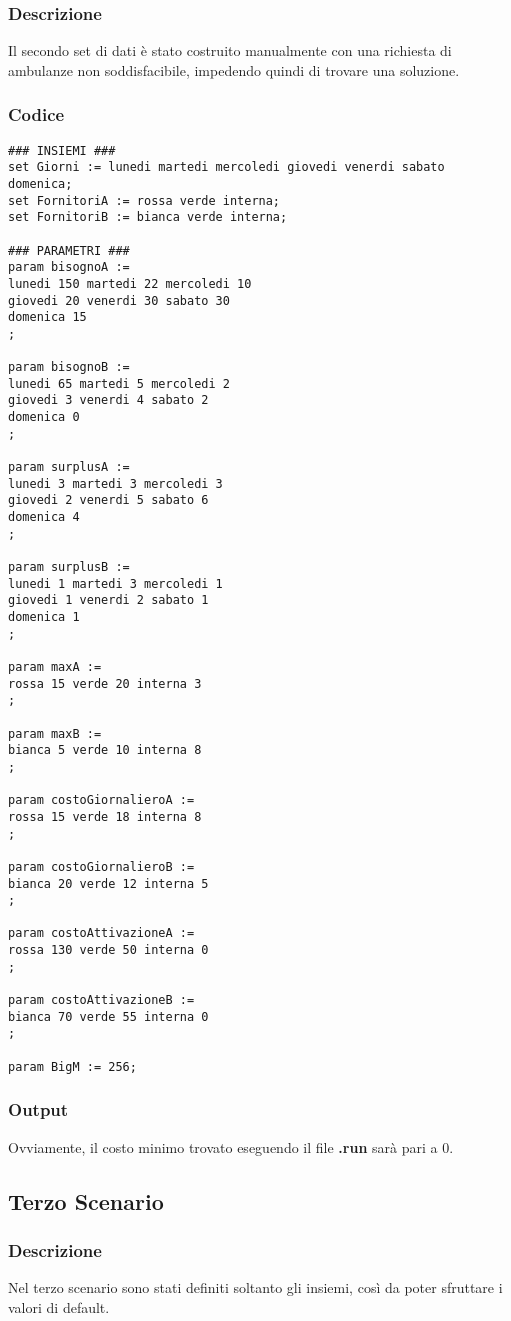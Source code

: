 \subsubsection{Descrizione}
Il secondo set di dati è stato costruito manualmente con una richiesta di ambulanze non soddisfacibile, impedendo quindi di trovare una soluzione.
\subsubsection{Codice}
\begin{lstlisting}
### INSIEMI ###
set Giorni := lunedi martedi mercoledi giovedi venerdi sabato domenica;
set FornitoriA := rossa verde interna;
set FornitoriB := bianca verde interna;

### PARAMETRI ###
param bisognoA := 
lunedi 150 martedi 22 mercoledi 10 
giovedi 20 venerdi 30 sabato 30
domenica 15
;

param bisognoB := 
lunedi 65 martedi 5 mercoledi 2
giovedi 3 venerdi 4 sabato 2
domenica 0
;

param surplusA :=
lunedi 3 martedi 3 mercoledi 3
giovedi 2 venerdi 5 sabato 6
domenica 4
;

param surplusB :=
lunedi 1 martedi 3 mercoledi 1
giovedi 1 venerdi 2 sabato 1
domenica 1
;

param maxA :=
rossa 15 verde 20 interna 3
;

param maxB :=
bianca 5 verde 10 interna 8
;

param costoGiornalieroA :=
rossa 15 verde 18 interna 8
;

param costoGiornalieroB :=
bianca 20 verde 12 interna 5
;

param costoAttivazioneA :=
rossa 130 verde 50 interna 0
;

param costoAttivazioneB :=
bianca 70 verde 55 interna 0
; 

param BigM := 256;
\end{lstlisting}
\subsubsection{Output}
Ovviamente, il costo minimo trovato eseguendo il file \textbf{.run} sarà pari a \texteuro $0$.

\subsection{Terzo Scenario}
\subsubsection{Descrizione}
Nel terzo scenario sono stati definiti soltanto gli insiemi, così da poter sfruttare i valori di default.
